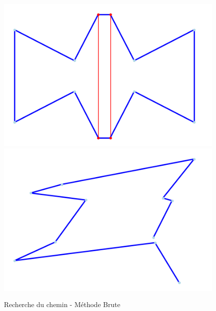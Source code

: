 \documentclass{article}
\begin{document}
\begin{figure}
	\centering
	\includegraphics[scale=0.4]{image/Exemple8dechet.png}
	\includegraphics[scale=0.4]{image/Exmple10dechet.png}
	\caption{Recherche du chemin - Méthode Brute}
	\label{tsp_dechet}
\end{figure}
\end{document}
